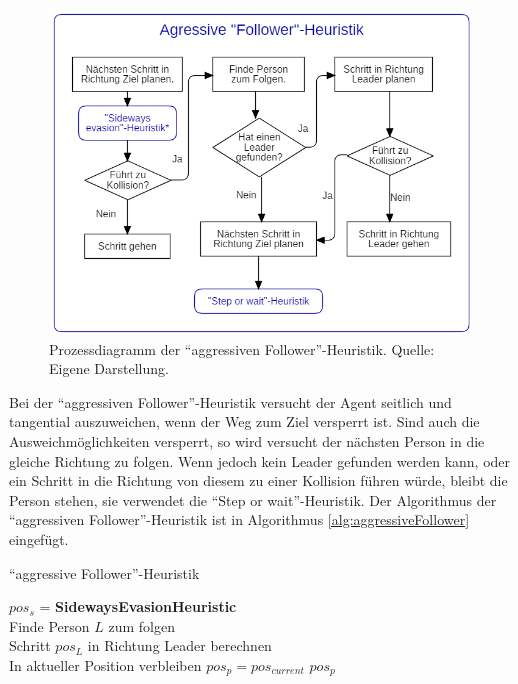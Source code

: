 \begin{figure}[H]
	\centering
		\includegraphics[width=1.0\textwidth]{pictures/model/algorithm/heuristics/aggressive_follower_heuristic.png}
	\caption{Prozessdiagramm der "`aggressiven Follower"'-Heuristik. Quelle: Eigene Darstellung.}
	\label{fig:AFH}
\end{figure}
Bei der "`aggressiven Follower"'-Heuristik versucht der Agent seitlich und tangential auszuweichen, wenn der Weg zum Ziel versperrt ist. Sind auch die Ausweichmöglichkeiten versperrt, so wird versucht der nächsten Person in die gleiche Richtung zu folgen. Wenn jedoch kein Leader gefunden werden kann, oder ein Schritt in die Richtung von diesem zu einer Kollision führen würde, bleibt die Person stehen, sie verwendet die "`Step or wait"'-Heuristik. Der Algorithmus der "`aggressiven Follower"'-Heuristik ist in Algorithmus \ref{alg:aggressiveFollower} eingefügt.
\clearpage
\begin{algorithm} [H]
	\caption{"`aggressive Follower"'-Heuristik}
	\label{alg:aggressiveFollower}
	
	\AggressiveFollowerHeuristic{} {
		$pos_s$ = \textbf{SidewaysEvasionHeuristic}\\
		 {
			Finde Person $L$ zum folgen \\
			 { 
				Schritt $pos_L$ in Richtung Leader berechnen \\
				 {
					In aktueller Position verbleiben $pos_p = pos_{current}$ 
				} 
			} 
		} 
		\Return $pos_p$
	}
\end{algorithm}

